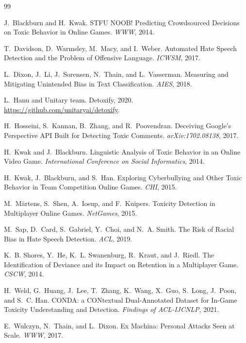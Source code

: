 \documentclass[11pt,twocolumn,letterpaper]{article}
\begin{document}
\clearpage
\begin{thebibliography}{99}
\small

J.~Blackburn and H.~Kwak.
\newblock STFU NOOB! Predicting Crowdsourced Decisions on Toxic Behavior in Online Games.
\newblock \textit{WWW}, 2014.

T.~Davidson, D.~Warmsley, M.~Macy, and I.~Weber.
\newblock Automated Hate Speech Detection and the Problem of Offensive Language.
\newblock \textit{ICWSM}, 2017.

L.~Dixon, J.~Li, J.~Sorensen, N.~Thain, and L.~Vasserman.
\newblock Measuring and Mitigating Unintended Bias in Text Classification.
\newblock \textit{AIES}, 2018.

L.~Hanu and Unitary team.
\newblock Detoxify, 2020.
\newblock \url{https://github.com/unitaryai/detoxify}.

H.~Hosseini, S.~Kannan, B.~Zhang, and R.~Poovendran.
\newblock Deceiving Google's Perspective API Built for Detecting Toxic Comments.
\newblock \textit{arXiv:1702.08138}, 2017.

H.~Kwak and J.~Blackburn.
\newblock Linguistic Analysis of Toxic Behavior in an Online Video Game.
\newblock \textit{International Conference on Social Informatics}, 2014.

H.~Kwak, J.~Blackburn, and S.~Han.
\newblock Exploring Cyberbullying and Other Toxic Behavior in Team Competition Online Games.
\newblock \textit{CHI}, 2015.

M.~M\"{a}rtens, S.~Shen, A.~Iosup, and F.~Kuipers.
\newblock Toxicity Detection in Multiplayer Online Games.
\newblock \textit{NetGames}, 2015.

M.~Sap, D.~Card, S.~Gabriel, Y.~Choi, and N.~A. Smith.
\newblock The Risk of Racial Bias in Hate Speech Detection.
\newblock \textit{ACL}, 2019.

K.~B. Shores, Y.~He, K.~L. Swanenburg, R.~Kraut, and J.~Riedl.
\newblock The Identification of Deviance and its Impact on Retention in a Multiplayer Game.
\newblock \textit{CSCW}, 2014.

H.~Weld, G.~Huang, J.~Lee, T.~Zhang, K.~Wang, X.~Guo, S.~Long, J.~Poon, and S.~C. Han.
\newblock CONDA: a CONtextual Dual-Annotated Dataset for In-Game Toxicity Understanding and Detection.
\newblock \textit{Findings of ACL-IJCNLP}, 2021.

E.~Wulczyn, N.~Thain, and L.~Dixon.
\newblock Ex Machina: Personal Attacks Seen at Scale.
\newblock \textit{WWW}, 2017.

\end{thebibliography}
\end{document}
